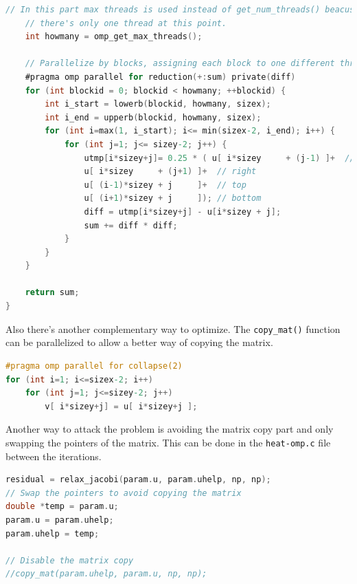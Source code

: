 \documentclass[a4paper]{article}
\newenvironment{questionenum}{%
\setlist[enumerate]{resume}
\restartlist{enumerate}
\newcommand{\question}[1]{
\begin{enumerate}
	\item\bfseries ##1
\end{enumerate}
}}{%
}
\begin{document}
\begin{questionenum}
\begin{center}
\begin{minipage}{0.9\textwidth}
\begin{lstlisting}[language=C, title=\texttt{solver-tareador.c}]
	// In this part max threads is used instead of get_num_threads() beacuse 
	// there's only one thread at this point.
	int howmany = omp_get_max_threads();
		
	// Parallelize by blocks, assigning each block to one different thread
	#pragma omp parallel for reduction(+:sum) private(diff)
	for (int blockid = 0; blockid < howmany; ++blockid) {
		int i_start = lowerb(blockid, howmany, sizex);
		int i_end = upperb(blockid, howmany, sizex);
		for (int i=max(1, i_start); i<= min(sizex-2, i_end); i++) {
			for (int j=1; j<= sizey-2; j++) {
				utmp[i*sizey+j]= 0.25 * ( u[ i*sizey     + (j-1) ]+  // left
				u[ i*sizey     + (j+1) ]+  // right
				u[ (i-1)*sizey + j     ]+  // top
				u[ (i+1)*sizey + j     ]); // bottom
				diff = utmp[i*sizey+j] - u[i*sizey + j];
				sum += diff * diff;
			}
		}
	}
	
	return sum;
}
		\end{lstlisting}
	\end{minipage}
	\end{center}
	
	Also there's another complementary way to optimize. The \texttt{copy\_mat()} function can be parallelized to allow a better way of copying the matrix.
	
	\begin{center}
		\begin{minipage}{0.8\textwidth}
			\begin{lstlisting}[language=C, title=\texttt{solver-tareador.c}]
#pragma omp parallel for collapse(2)
for (int i=1; i<=sizex-2; i++)
	for (int j=1; j<=sizey-2; j++)
		v[ i*sizey+j] = u[ i*sizey+j ];
			\end{lstlisting}
		\end{minipage}
	\end{center}

	Another way to attack the problem is avoiding the matrix copy part and only swapping the pointers of the matrix. This can be done in the \texttt{heat-omp.c} file between the iterations.
	
	\begin{center}
		\begin{minipage}{0.8\textwidth}
			\begin{lstlisting}[language=C, title=\texttt{heat-omp.c}]
residual = relax_jacobi(param.u, param.uhelp, np, np);
// Swap the pointers to avoid copying the matrix
double *temp = param.u;
param.u = param.uhelp;
param.uhelp = temp;

// Disable the matrix copy
//copy_mat(param.uhelp, param.u, np, np);
			\end{lstlisting}
		\end{minipage}
	\end{center}
	

\end{questionenum}
\end{document}
